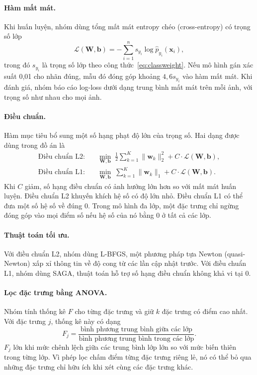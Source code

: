 \paragraph{Hàm mất mát.} Khi huấn luyện, nhóm dùng tổng mất mát entropy chéo (cross-entropy) có trọng số lớp
\begin{equation}
  \mathcal{L}(\mathbf{W}, \mathbf{b}) = - \sum_{i=1}^{n} s_{y_i} \log \hat{p}_{y_i}(\mathbf{x}_i) ,
  \label{eq:ce}
\end{equation}
trong đó $s_{y_i}$ là trọng số lớp theo công thức~\eqref{eq:classweight}. Nếu mô hình gán xác suất 0,01 cho nhãn đúng, mẫu đó đóng góp khoảng $4{,}6 s_{y_i}$ vào hàm mất mát. Khi đánh giá, nhóm báo cáo log-loss dưới dạng trung bình mất mát trên mỗi ảnh, với trọng số như nhau cho mọi ảnh.

\paragraph{Điều chuẩn.} Hàm mục tiêu bổ sung một số hạng phạt độ lớn của trọng số. Hai dạng được dùng trong đồ án là
\begin{align}
  \text{Điều chuẩn L2:} \quad & \min_{\mathbf{W}, \mathbf{b}} \; \frac{1}{2} \sum_{k=1}^{K} \lVert \mathbf{w}_k \rVert_2^2 + C \cdot \mathcal{L}(\mathbf{W}, \mathbf{b}) , \label{eq:l2}\\
  \text{Điều chuẩn L1:} \quad & \min_{\mathbf{W}, \mathbf{b}} \; \sum_{k=1}^{K} \lVert \mathbf{w}_k \rVert_1 + C \cdot \mathcal{L}(\mathbf{W}, \mathbf{b}) . \label{eq:l1}
\end{align}
Khi $C$ giảm, số hạng điều chuẩn có ảnh hưởng lớn hơn so với mất mát huấn luyện. Điều chuẩn L2 khuyến khích hệ số có độ lớn nhỏ. Điều chuẩn L1 có thể đưa một số hệ số về đúng 0. Trong mô hình đa lớp, một đặc trưng chỉ ngừng đóng góp vào mọi điểm số nếu hệ số của nó bằng 0 ở tất cả các lớp.

\paragraph{Thuật toán tối ưu.} Với điều chuẩn L2, nhóm dùng L-BFGS, một phương pháp tựa Newton (quasi-Newton) xấp xỉ thông tin về độ cong từ các lần cập nhật trước. Với điều chuẩn L1, nhóm dùng SAGA, thuật toán hỗ trợ số hạng điều chuẩn không khả vi tại 0.

\paragraph{Lọc đặc trưng bằng ANOVA.} Nhóm tính thống kê $F$ cho từng đặc trưng và giữ $k$ đặc trưng có điểm cao nhất. Với đặc trưng $j$, thống kê này có dạng
\begin{equation}
  F_j = \frac{\text{bình phương trung bình giữa các lớp}}{\text{bình phương trung bình trong các lớp}} .
\end{equation}
$F_j$ lớn khi mức chênh lệch giữa các trung bình lớp lớn so với mức biến thiên trong từng lớp. Vì phép lọc chấm điểm từng đặc trưng riêng lẻ, nó có thể bỏ qua những đặc trưng chỉ hữu ích khi xét cùng các đặc trưng khác.

